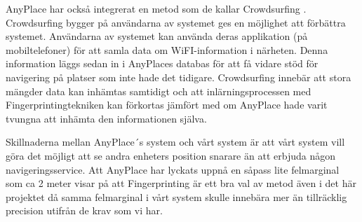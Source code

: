 \documentclass[swedish, a4paper,12pt]{article}
\begin{document}
AnyPlace har också integrerat en metod som de kallar Crowdsurfing \cite{anyplace}. Crowdsurfing bygger på användarna av systemet ges en möjlighet att förbättra systemet. Användarna av systemet kan använda deras applikation (på mobiltelefoner) för att samla data om WiFI-information i närheten. Denna information läggs sedan in i AnyPlaces databas för att få vidare stöd för navigering på platser som inte hade det tidigare. Crowdsurfing innebär att stora mängder data kan inhämtas samtidigt och att inlärningsprocessen med Fingerprintingtekniken kan förkortas jämfört med om AnyPlace hade varit tvungna att inhämta den informationen själva.

Skillnaderna mellan AnyPlace´s system och vårt system är att vårt system vill göra det möjligt att se andra enheters position snarare än att erbjuda någon navigeringsservice. Att AnyPlace har lyckats uppnå en såpass lite felmarginal som ca 2 meter visar på att Fingerprinting är ett bra val av metod även i det här projektet då samma felmarginal i vårt system skulle innebära mer än tillräcklig precision utifrån de krav som vi har.




\end{document}
